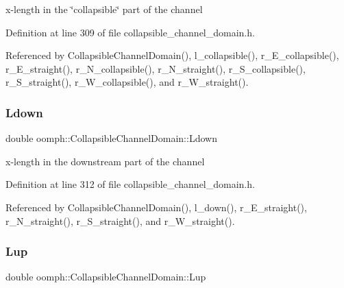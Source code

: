 x-\/length in the \char`\"{}collapsible\char`\"{} part of the channel 



Definition at line 309 of file collapsible\+\_\+channel\+\_\+domain.\+h.



Referenced by Collapsible\+Channel\+Domain(), l\+\_\+collapsible(), r\+\_\+\+E\+\_\+collapsible(), r\+\_\+\+E\+\_\+straight(), r\+\_\+\+N\+\_\+collapsible(), r\+\_\+\+N\+\_\+straight(), r\+\_\+\+S\+\_\+collapsible(), r\+\_\+\+S\+\_\+straight(), r\+\_\+\+W\+\_\+collapsible(), and r\+\_\+\+W\+\_\+straight().

\mbox{\label{classoomph_1_1CollapsibleChannelDomain_ade4ee8220972fe6c454211d1f837fcf9}} 
\subsubsection{\texorpdfstring{Ldown}{Ldown}}
{\footnotesize\ttfamily double oomph\+::\+Collapsible\+Channel\+Domain\+::\+Ldown\hspace{0.3cm}{\ttfamily [private]}}



x-\/length in the downstream part of the channel 



Definition at line 312 of file collapsible\+\_\+channel\+\_\+domain.\+h.



Referenced by Collapsible\+Channel\+Domain(), l\+\_\+down(), r\+\_\+\+E\+\_\+straight(), r\+\_\+\+N\+\_\+straight(), r\+\_\+\+S\+\_\+straight(), and r\+\_\+\+W\+\_\+straight().

\mbox{\label{classoomph_1_1CollapsibleChannelDomain_a1c4dbe3313e696290ad9da4765d0a0e1}} 
\subsubsection{\texorpdfstring{Lup}{Lup}}
{\footnotesize\ttfamily double oomph\+::\+Collapsible\+Channel\+Domain\+::\+Lup\hspace{0.3cm}{\ttfamily [private]}}



